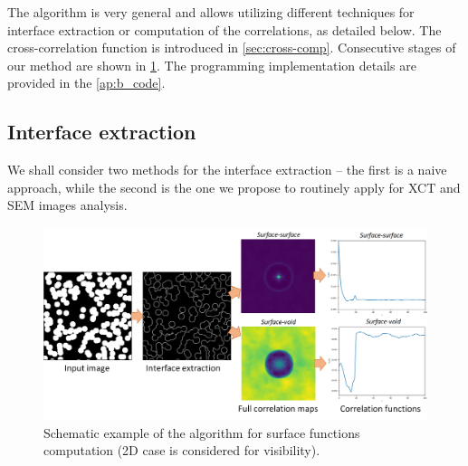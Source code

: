 \documentclass[reprint,amsmath,amssymb,aps,pre,showkeys,showpacs]{revtex4-1}
\begin{document}
The algorithm is very general and allows utilizing different techniques for
interface extraction or computation of the correlations, as detailed below. The
cross-correlation function is introduced in \cref{sec:cross-comp}. Consecutive
stages of our method are shown in \cref{fig:stages}. The programming implementation details are provided in the \cref{ap:b_code}.

\subsection{Interface extraction}
We shall consider two methods for the interface extraction -- the first is a
naive approach, while the second is the one we propose to routinely apply for XCT and SEM
images analysis.

\begin{figure}[!pt]
  \centering
  \includegraphics[width=0.6\linewidth]{images/algo.png}
  \caption[]{Schematic example of the algorithm for surface
  functions computation (2D case is considered for visibility).}
  \label{fig:stages}
\end{figure}
\end{document}
